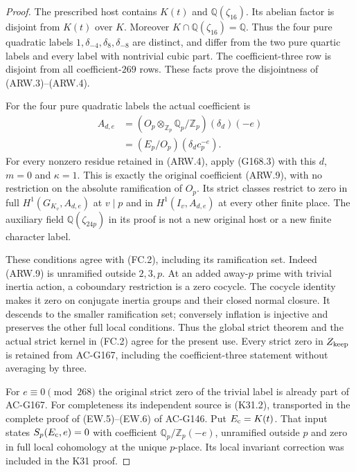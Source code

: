 \begin{proof}
The prescribed host contains $K(t)$ and $\mathbb Q(\zeta_{16})$.
Its abelian factor is disjoint from $K(t)$ over $K$.
Moreover $K\cap\mathbb Q(\zeta_{16})=\mathbb Q$.
Thus the four pure quadratic labels $1,\delta_{-4},\delta_8,
\delta_{-8}$ are distinct, and differ from the two pure quartic
labels and every label with nontrivial cubic part.
The coefficient-three row is disjoint from all coefficient-$269$
rows.  These facts prove the disjointness of (ARW.3)--(ARW.4).

For the four pure quadratic labels the actual coefficient is
\[
 \begin{aligned}
 A_{d,e}&=(O_p\otimes_{\mathbb Z_p}\mathbb Q_p/\mathbb Z_p)
                                                  (\delta_d)(-e)\\
        &=(E_p/O_p)(\delta_dc_p^{-e}).
 \end{aligned}
 \tag{ARW.9}
\]
For every nonzero residue retained in (ARW.4), apply (G168.3)
with this $d$, $m=0$ and $\kappa=1$.
This is exactly the original coefficient (ARW.9), with no
restriction on the absolute ramification of $O_p$.
Its strict classes restrict to zero in full $H^1(G_{K_v},A_{d,e})$
at $v\mid p$ and in $H^1(I_v,A_{d,e})$ at every other finite place.
The auxiliary field $\mathbb Q(\zeta_{24p})$ in its proof
is not a new original host or a new finite character label.

These conditions agree with (FC.2), including its ramification set.
Indeed (ARW.9) is unramified outside $2,3,p$.
At an added away-$p$ prime with trivial inertia action, a
coboundary restriction is a zero cocycle.  The cocycle identity
makes it zero on conjugate inertia groups and their closed
normal closure.  It descends to the smaller ramification set;
conversely inflation is injective and preserves the other
full local conditions.  Thus the global strict theorem and
the actual strict kernel in (FC.2) agree for the present use.
Every strict zero in $Z_{\rm keep}$ is retained from AC-G167,
including the coefficient-three statement without averaging by three.

For $e\equiv0\pmod{268}$ the original strict zero of the
trivial label is already part of AC-G167.
For completeness its independent source is (K31.2), transported
in the complete proof of (EW.5)--(EW.6) of AC-G146.
Put $E_{\rm c}=K(t)$.  That input states
$S_p(E_{\rm c},e)=0$ with coefficient
$\mathbb Q_p/\mathbb Z_p(-e)$, unramified outside $p$ and
zero in full local cohomology at the unique $p$-place.
Its local invariant correction was included in the K31 proof.


\end{proof}
